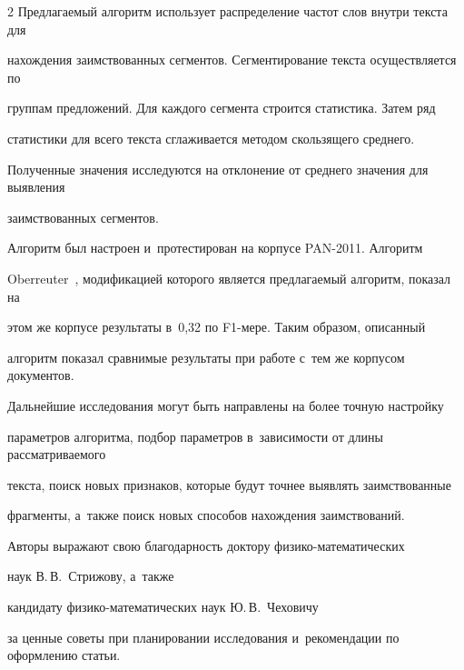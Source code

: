 \begin{multicols}{2}
Предлагаемый алгоритм использует распределение частот слов внутри текста для 

нахождения заимствованных сегментов. Сегментирование текста осуществляется по 

группам предложений. Для каждого сегмента строится статистика. Затем ряд 

статистики для всего текста  сглаживается методом скользящего среднего. 

Полученные значения исследуются на отклонение от среднего значения для выявления 

заимствованных сегментов.



Алгоритм был настроен и~протестирован на корпусе PAN-2011. Алгоритм 

Oberreuter~\cite{Chile}, модификацией которого является предлагаемый алгоритм, показал на 

этом же корпусе результаты в~0,32 по {F1-мере}. Таким образом, описанный 

алгоритм показал сравнимые результаты при работе с~тем же корпусом документов.



Дальнейшие исследования могут быть на\-прав\-ле\-ны на более точную настройку 

параметров алгоритма, подбор параметров в~зависимости от длины рассматриваемого 

текста, поиск новых признаков, которые будут точнее выявлять заимствованные\linebreak 

фрагменты, а~также поиск новых способов на\-хож\-де\-ния заимствований.



\bigskip



Авторы выражают свою благодарность доктору фи\-зи\-ко-ма\-те\-ма\-ти\-че\-ских 

наук В.\,В.~Стрижову, а~также 

кандидату фи\-зи\-ко-ма\-те\-ма\-ти\-че\-ских наук Ю.\,В.~Чеховичу 

за ценные советы при планировании исследования и~рекомендации по оформлению статьи.







{\small\frenchspacing

 {%


}}
\end{multicols}
